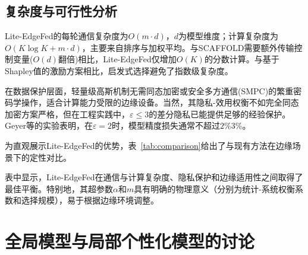\documentclass[a4paper,12pt]{article}
\begin{document}
\subsection{复杂度与可行性分析}

Lite-EdgeFed的每轮通信复杂度为$O(m \cdot d)$，$d$为模型维度；计算复杂度为$O(K \log K + m \cdot d)$，主要来自排序与加权平均。与SCAFFOLD\cite{karimireddy2020scaffold}需要额外传输控制变量($O(d)$翻倍)相比，Lite-EdgeFed仅增加$O(K)$的分数计算。与基于Shapley值的激励方案相比，启发式选择避免了指数级复杂度。

在数据保护层面，轻量级高斯机制无需同态加密或安全多方通信(SMPC)的繁重密码学操作，适合计算能力受限的边缘设备。当然，其隐私-效用权衡不如完全同态加密方案严格，但在工程实践中，$\varepsilon \leq 3$的差分隐私已能提供足够的经验保护。Geyer等\cite{geyer2017differentially}的实验表明，在$\varepsilon=2$时，模型精度损失通常不超过$2\%$\text{--}$3\%$。

为直观展示Lite-EdgeFed的优势，表~\ref{tab:comparison}给出了与现有方法在边缘场景下的定性对比。

\begin{table}[htbp]
\centering
\caption{Lite-EdgeFed与现有方法在边缘场景下的定性对比}
\label{tab:comparison}
\small
{}
\end{table}

表中显示，Lite-EdgeFed在通信与计算复杂度、隐私保护和边缘适用性之间取得了最佳平衡。特别地，其超参数$\alpha$和$m$具有明确的物理意义（分别为统计-系统权衡系数和选择规模），易于根据边缘环境调整。

\section{全局模型与局部个性化模型的讨论}
\end{document}
